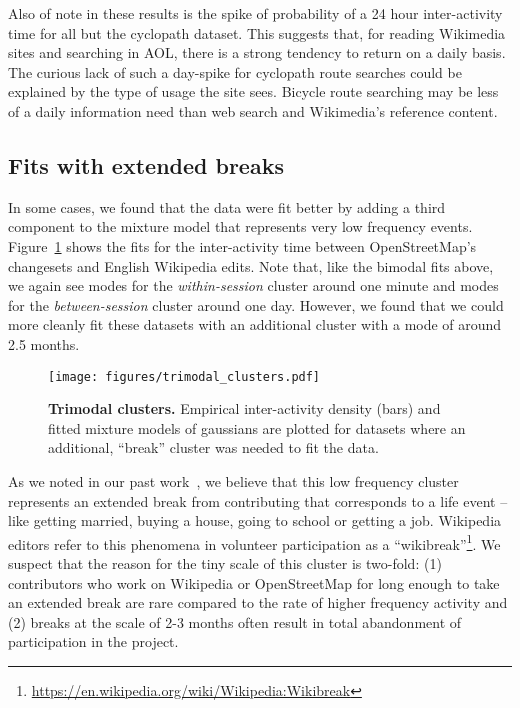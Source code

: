 Also of note in these results is the spike of probability of a 24 hour inter-activity time for all but the cyclopath dataset.  This suggests that, for reading Wikimedia sites and searching in AOL, there is a strong tendency to return on a daily basis.  The curious lack of such a day-spike for cyclopath route searches could be explained by the type of usage the site sees. Bicycle route searching may be less of a daily information need than web search and Wikimedia's reference content.

\subsection{Fits with extended breaks}
In some cases, we found that the data were fit better by adding a third component to the mixture model that represents very low frequency events.  Figure~\ref{fig:trimodal_clusters} shows the fits for the inter-activity time between OpenStreetMap's changesets and English Wikipedia edits.  Note that, like the bimodal fits above, we again see modes for the \emph{within-session} cluster around one minute and modes for the \emph{between-session} cluster around one day.  However, we found that we could more cleanly fit these datasets with an additional cluster with a mode of around 2.5 months.

\begin{figure}
\centering
\texttt{[image: figures/trimodal\_clusters.pdf]}
\caption{
    \textbf{Trimodal clusters.} Empirical inter-activity density (bars) and fitted mixture models of gaussians are plotted for datasets where an additional, ``break'' cluster was needed to fit the data.
}
\label{fig:trimodal_clusters}
\end{figure}

As we noted in our past work~\cite{geiger2013using}, we believe that this low frequency cluster represents an extended break from contributing that corresponds to a life event -- like getting married, buying a house, going to school or getting a job.  Wikipedia editors refer to this phenomena in volunteer participation as a ``wikibreak''\footnote{\url{https://en.wikipedia.org/wiki/Wikipedia:Wikibreak}}.  We suspect that the reason for the tiny scale of this cluster is two-fold: (1) contributors who work on Wikipedia or OpenStreetMap for long enough to take an extended break are rare compared to the rate of higher frequency activity and (2) breaks at the scale of 2-3 months often result in total abandonment of participation in the project.

